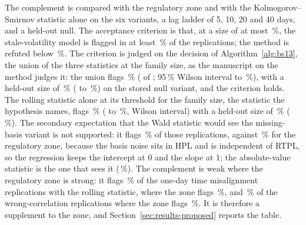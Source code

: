 The complement is compared with the regulatory zone and with the Kolmogorov--Smirnov statistic alone on the six variants, a lag ladder of 5, 10, 20 and 40 days, and a held-out null. The acceptance criterion is that, at a size of at most \pxThirteenSize{}\,\%, the stale-volatility model is flagged in at least \pxThirteenThresholdPower{}\,\% of the replications; the method is refuted below \pxThirteenRefuted{}\,\%. The criterion is judged on the decision of Algorithm~\ref{alg:bs13}, the union of the three statistics at the family size, as the manuscript on the method judges it: the union flags \pxThirteenUnionPower{}\,\% (\pxThirteenUnionK{} of \pxThirteenN{}; 95\,\% Wilson interval \pxPpThirteenUnionLo{} to \pxPpThirteenUnionHi{}\,\%), with a held-out size of \pxThirteenNullUnion{}\,\% (\pxPpThirteenHeldLo{} to \pxPpThirteenHeldHi{}\,\%) on the stored null variant, and the criterion holds. The rolling statistic alone at its threshold for the family size, the statistic the hypothesis names, flags \pxThirteenPowerRate{}\,\% (\pxThirteenCiLo{} to \pxThirteenCiHi{}\,\%, Wilson interval) with a held-out size of \pxThirteenHeld{}\,\% (\pxThirteenHeldCi{}\,\%). The secondary expectation that the Wald statistic would see the missing-basis variant is not supported: it flags \pxThirteenMissingWald{}\,\% of those replications, against \pxThirteenMissingPla{}\,\% for the regulatory zone, because the basis noise sits in HPL and is independent of RTPL, so the regression keeps the intercept at 0 and the slope at 1; the absolute-value statistic is the one that sees it (\pxThirteenMissingAbs{}\,\%). The complement is weak where the regulatory zone is strong: it flags \pxThirteenMisalignRoll{}\,\% of the one-day time misalignment replications with the rolling statistic, where the zone flags \pxThirteenMisalignPla{}\,\%, and \pxThirteenWrongRoll{}\,\% of the wrong-correlation replications where the zone flags \pxThirteenWrongPla{}\,\%. It is therefore a supplement to the zone, and Section~\ref{sec:results-proposed} reports the table.

